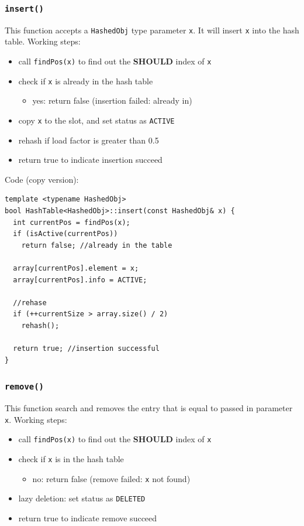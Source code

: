 \documentclass[11pt]{book}
\begin{document}
\subsubsection{\texttt{insert()}}
\label{sec:org1045e3a}
This function accepts a \texttt{HashedObj} type parameter \texttt{x}. It will insert \texttt{x} into the hash table. Working steps:
\begin{itemize}
\item call \texttt{findPos(x)} to find out the \textbf{SHOULD} index of \texttt{x}
\item check if \texttt{x} is already in the hash table
\begin{itemize}
\item yes: return false (insertion failed: already in)
\end{itemize}
\item copy \texttt{x} to the slot, and set status as \texttt{ACTIVE}
\item rehash if load factor is greater than 0.5
\item return true to indicate insertion succeed
\end{itemize}

Code (copy version):
\begin{verbatim}
template <typename HashedObj>
bool HashTable<HashedObj>::insert(const HashedObj& x) {
  int currentPos = findPos(x);
  if (isActive(currentPos))
    return false; //already in the table

  array[currentPos].element = x;
  array[currentPos].info = ACTIVE;

  //rehase 
  if (++currentSize > array.size() / 2)
    rehash();

  return true; //insertion successful
}
\end{verbatim}

\subsubsection{\texttt{remove()}}
\label{sec:org0e5f1c5}
This function search and removes the entry that is equal to passed in parameter \texttt{x}. Working steps:
\begin{itemize}
\item call \texttt{findPos(x)} to find out the \textbf{SHOULD} index of \texttt{x}
\item check if \texttt{x} is in the hash table
\begin{itemize}
\item no: return false (remove failed: \texttt{x} not found)
\end{itemize}
\item lazy deletion: set status as \texttt{DELETED}
\item return true to indicate remove succeed
\end{itemize}
\end{document}
